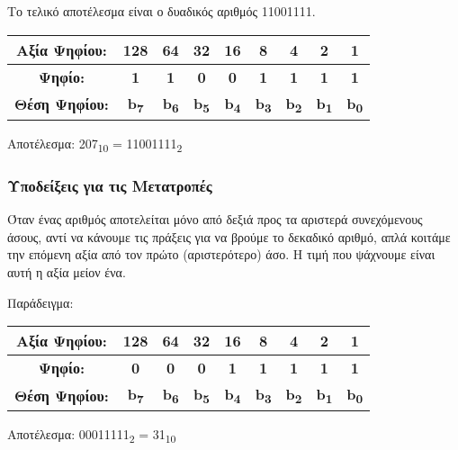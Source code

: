 Το τελικό αποτέλεσμα είναι ο δυαδικός αριθμός 11001111.

\begin{center}
\begin{tabular}{|c|c|c|c|c|c|c|c|c|}
\hline
Αξία Ψηφίου: & 128 & 64 & 32 & 16 & 8 & 4 & 2 & 1 \\
\hline
\textbf{Ψηφίο:} & \textbf{1} & \textbf{1} & \textbf{0} & \textbf{0} & \textbf{1} & \textbf{1} & \textbf{1} & \textbf{1} \\
\hline
\textbf{Θέση Ψηφίου:} & \textbf{b\textsubscript{7}}& \textbf{b\textsubscript{6}} & \textbf{b\textsubscript{5}} & \textbf{b\textsubscript{4}} & \textbf{b\textsubscript{3}}& \textbf{b\textsubscript{2}} & \textbf{b\textsubscript{1}} & \textbf{b\textsubscript{0}}  \\
\hline
\end{tabular}

Αποτέλεσμα: 207\textsubscript{10} = 11001111\textsubscript{2}
\end{center}

\subsubsection*{Υποδείξεις για τις Μετατροπές}

Όταν ένας αριθμός αποτελείται μόνο από δεξιά προς τα αριστερά συνεχόμενους άσους, αντί να κάνουμε τις πράξεις για να βρούμε το δεκαδικό αριθμό, απλά κοιτάμε την επόμενη αξία από τον πρώτο (αριστερότερο) άσο. Η τιμή που ψάχνουμε είναι αυτή η αξία μείον ένα.

Παράδειγμα:

\begin{center}
\begin{tabular}{|c|c|c|c|c|c|c|c|c|}
\hline
Αξία Ψηφίου: & 128 & 64 & 32 & 16 & 8 & 4 & 2 & 1 \\
\hline
\textbf{Ψηφίο:} & \textbf{0} & \textbf{0} & \textbf{0} & \textbf{1} & \textbf{1} & \textbf{1} & \textbf{1} & \textbf{1} \\
\hline
\textbf{Θέση Ψηφίου:} & \textbf{b\textsubscript{7}}& \textbf{b\textsubscript{6}} & \textbf{b\textsubscript{5}} & \textbf{b\textsubscript{4}} & \textbf{b\textsubscript{3}}& \textbf{b\textsubscript{2}} & \textbf{b\textsubscript{1}} & \textbf{b\textsubscript{0}}  \\
\hline
\end{tabular}

Αποτέλεσμα: 00011111\textsubscript{2} = 31\textsubscript{10} 
\end{center}

